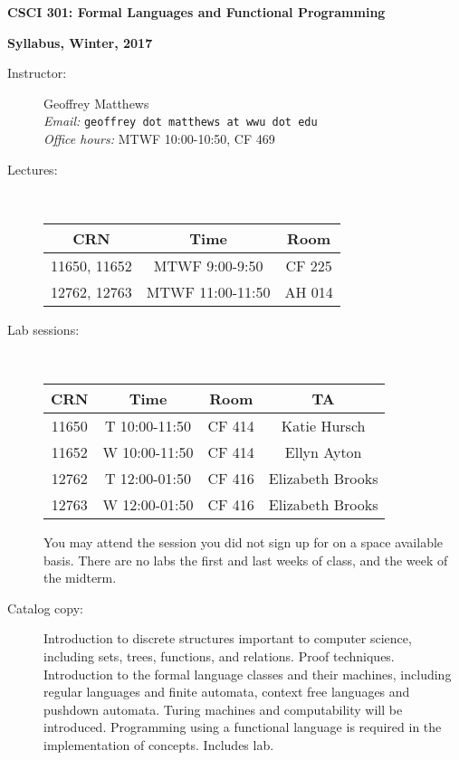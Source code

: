 \documentclass{article}
\begin{document}
\centerline{\Large\bf CSCI 301: Formal Languages and Functional Programming}
\centerline{\large\bf Syllabus, Winter, 2017}


\begin{description}


\item[Instructor:] Geoffrey Matthews\\
{\em Email:} {\tt geoffrey dot matthews at wwu dot edu}\\
{\em Office hours:} MTWF 10:00-10:50, CF 469


\item[Lectures:] \mbox{}\\
\begin{tabular}{ccc}
  CRN & Time & Room \\\hline
  11650, 11652 & MTWF 9:00-9:50 & CF 225 \\
  12762, 12763 & MTWF 11:00-11:50 & AH 014 
  \end{tabular}

\item[Lab sessions:]\mbox{}\\
  \hfill
  \begin{tabular}{cccc}
    CRN & Time & Room & TA\\\hline
  11650 & T 10:00-11:50 & CF 414 & Katie Hursch\\
  11652 & W 10:00-11:50 & CF 414 & Ellyn Ayton\\
  12762 & T 12:00-01:50 & CF 416 & Elizabeth Brooks \\
  12763 & W 12:00-01:50 & CF 416 & Elizabeth Brooks \\
  \end{tabular}
  \hfill
  \mbox{}
  
You may attend the session you did not sign up for on a space
available basis.  There are no labs the first and last weeks of class,
and the week of the midterm.

\item[Catalog copy:] Introduction to discrete structures important to
  computer science, including sets, trees, functions, and
  relations. Proof techniques. Introduction to the formal language
  classes and their machines, including regular languages and finite
  automata, context free languages and pushdown automata. Turing
  machines and computability will be introduced. Programming using a
  functional language is required in the implementation of
  concepts. Includes lab.


\end{description}
\end{document}

